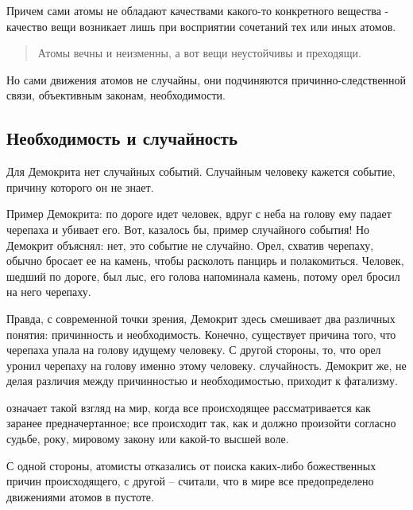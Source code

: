 \documentclass[
]{article}
\providecommand{\tightlist}{%
  \setlength{\itemsep}{0pt}\setlength{\parskip}{0pt}}
\begin{document}
Причем сами атомы не обладают качествами какого-то конкретного вещества
- качество вещи возникает лишь при восприятии сочетаний тех или иных
атомов.

\begin{quote}
Атомы вечны и неизменны, а вот вещи неустойчивы и преходящи.
\end{quote}

Но сами движения атомов не случайны, они подчиняются
причинно-следственной связи, объективным законам, необходимости.

\hypertarget{ux43dux435ux43eux431ux445ux43eux434ux438ux43cux43eux441ux442ux44c-ux438-ux441ux43bux443ux447ux430ux439ux43dux43eux441ux442ux44c}{%
\subsection{Необходимость и
случайность}\label{ux43dux435ux43eux431ux445ux43eux434ux438ux43cux43eux441ux442ux44c-ux438-ux441ux43bux443ux447ux430ux439ux43dux43eux441ux442ux44c}}

Для Демокрита нет случайных событий. Случайным человеку кажется событие,
причину которого он не знает.

Пример Демокрита: по дороге идет человек, вдруг с неба на голову ему
падает черепаха и убивает его. Вот, казалось бы, пример случайного
события! Но Демокрит объяснял: нет, это событие не случайно. Орел,
схватив черепаху, обычно бросает ее на камень, чтобы расколоть панцирь и
полакомиться. Человек, шедший по дороге, был лыс, его голова напоминала
камень, потому орел бросил на него черепаху.

Правда, с современной точки зрения, Демокрит здесь смешивает два
различных понятия: причинность и необходимость. Конечно, существует
причина того, что черепаха упала на голову идущему человеку. С другой
стороны, то, что орел уронил черепаху на голову именно этому человеку.
случайность. Демокрит же, не делая различия между причинностью и
необходимостью, приходит к фатализму.

\begin{description}
\tightlist
\item[\emph{Фатализм (от латинского «fatalis» - роковой,
предопределенный судьбой)} ---]
означает такой взгляд на мир, когда все происходящее рассматривается как
заранее предначертанное; все происходит так, как и должно произойти
согласно судьбе, року, мировому закону или какой-то высшей воле.
\end{description}

С одной стороны, атомисты отказались от поиска каких-либо божественных
причин происходящего, с другой -- считали, что в мире все предопределено
движениями атомов в пустоте.
\end{document}
